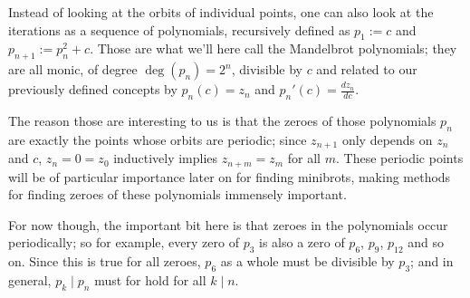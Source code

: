 \documentclass[12pt,a4paper]{article}
\begin{document}
Instead of looking at the orbits of individual points, one can also look at the iterations as a sequence of polynomials, recursively defined as $p_1:=c$ and $p_{n+1}:=p_n^2+c$. Those are what we'll here call the Mandelbrot polynomials; they are all monic, of degree $\deg(p_n)=2^n$, divisible by $c$ and related to our previously defined concepts by $p_n(c)=z_n$ and $p_n'(c)=\frac{dz_n}{dc}$.

The reason those are interesting to us is that the zeroes of those polynomials $p_n$ are exactly the points whose orbits are periodic; since $z_{n+1}$ only depends on $z_n$ and $c$, $z_n=0=z_0$ inductively implies $z_{n+m}=z_m$ for all $m$. These periodic points will be of particular importance later on for finding minibrots, making methods for finding zeroes of these polynomials immensely important.

For now though, the important bit here is that zeroes in the polynomials occur periodically; so for example, every zero of $p_3$ is also a zero of $p_6$, $p_9$, $p_{12}$ and so on. Since this is true for all zeroes, $p_6$ as a whole must be divisible by $p_3$; and in general, $p_k\mid p_n$ must for hold for all $k\mid n$.
\end{document}
